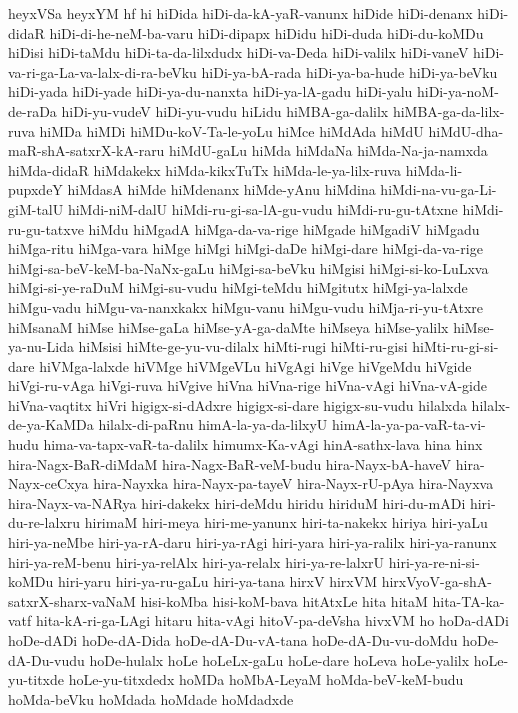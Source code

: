{heyxVSa
heyxYM
hf
hi
hiDida
hiDi-da-kA-yaR-vanunx
hiDide
hiDi-denanx
hiDi-didaR
hiDi-di-he-neM-ba-varu
hiDi-dipapx
hiDidu
hiDi-duda
hiDi-du-koMDu
hiDisi
hiDi-taMdu
hiDi-ta-da-lilxdudx
hiDi-va-Deda
hiDi-valilx
hiDi-vaneV
hiDi-va-ri-ga-La-va-lalx-di-ra-beVku
hiDi-ya-bA-rada
hiDi-ya-ba-hude
hiDi-ya-beVku
hiDi-yada
hiDi-yade
hiDi-ya-du-nanxta
hiDi-ya-lA-gadu
hiDi-yalu
hiDi-ya-noM-de-raDa
hiDi-yu-vudeV
hiDi-yu-vudu
hiLidu
hiMBA-ga-dalilx
hiMBA-ga-da-lilx-ruva
hiMDa
hiMDi
hiMDu-koV-Ta-le-yoLu
hiMce
hiMdAda
hiMdU
hiMdU-dha-maR-shA-satxrX-kA-raru
hiMdU-gaLu
hiMda
hiMdaNa
hiMda-Na-ja-namxda
hiMda-didaR
hiMdakekx
hiMda-kikxTuTx
hiMda-le-ya-lilx-ruva
hiMda-li-pupxdeY
hiMdasA
hiMde
hiMdenanx
hiMde-yAnu
hiMdina
hiMdi-na-vu-ga-Li-giM-talU
hiMdi-niM-dalU
hiMdi-ru-gi-sa-lA-gu-vudu
hiMdi-ru-gu-tAtxne
hiMdi-ru-gu-tatxve
hiMdu
hiMgadA
hiMga-da-va-rige
hiMgade
hiMgadiV
hiMgadu
hiMga-ritu
hiMga-vara
hiMge
hiMgi
hiMgi-daDe
hiMgi-dare
hiMgi-da-va-rige
hiMgi-sa-beV-keM-ba-NaNx-gaLu
hiMgi-sa-beVku
hiMgisi
hiMgi-si-ko-LuLxva
hiMgi-si-ye-raDuM
hiMgi-su-vudu
hiMgi-teMdu
hiMgitutx
hiMgi-ya-lalxde
hiMgu-vadu
hiMgu-va-nanxkakx
hiMgu-vanu
hiMgu-vudu
hiMja-ri-yu-tAtxre
hiMsanaM
hiMse
hiMse-gaLa
hiMse-yA-ga-daMte
hiMseya
hiMse-yalilx
hiMse-ya-nu-Lida
hiMsisi
hiMte-ge-yu-vu-dilalx
hiMti-rugi
hiMti-ru-gisi
hiMti-ru-gi-si-dare
hiVMga-lalxde
hiVMge
hiVMgeVLu
hiVgAgi
hiVge
hiVgeMdu
hiVgide
hiVgi-ru-vAga
hiVgi-ruva
hiVgive
hiVna
hiVna-rige
hiVna-vAgi
hiVna-vA-gide
hiVna-vaqtitx
hiVri
higigx-si-dAdxre
higigx-si-dare
higigx-su-vudu
hilalxda
hilalx-de-ya-KaMDa
hilalx-di-paRnu
himA-la-ya-da-lilxyU
himA-la-ya-pa-vaR-ta-vi-hudu
hima-va-tapx-vaR-ta-dalilx
himumx-Ka-vAgi
hinA-sathx-lava
hina
hinx
hira-Nagx-BaR-diMdaM
hira-Nagx-BaR-veM-budu
hira-Nayx-bA-haveV
hira-Nayx-ceCxya
hira-Nayxka
hira-Nayx-pa-tayeV
hira-Nayx-rU-pAya
hira-Nayxva
hira-Nayx-va-NARya
hiri-dakekx
hiri-deMdu
hiridu
hiriduM
hiri-du-mADi
hiri-du-re-lalxru
hirimaM
hiri-meya
hiri-me-yanunx
hiri-ta-nakekx
hiriya
hiri-yaLu
hiri-ya-neMbe
hiri-ya-rA-daru
hiri-ya-rAgi
hiri-yara
hiri-ya-ralilx
hiri-ya-ranunx
hiri-ya-reM-benu
hiri-ya-relAlx
hiri-ya-relalx
hiri-ya-re-lalxrU
hiri-ya-re-ni-si-koMDu
hiri-yaru
hiri-ya-ru-gaLu
hiri-ya-tana
hirxV
hirxVM
hirxVyoV-ga-shA-satxrX-sharx-vaNaM
hisi-koMba
hisi-koM-bava
hitAtxLe
hita
hitaM
hita-TA-ka-vatf
hita-kA-ri-ga-LAgi
hitaru
hita-vAgi
hitoV-pa-deVsha
hivxVM
ho
hoDa-dADi
hoDe-dADi
hoDe-dA-Dida
hoDe-dA-Du-vA-tana
hoDe-dA-Du-vu-doMdu
hoDe-dA-Du-vudu
hoDe-hulalx
hoLe
hoLeLx-gaLu
hoLe-dare
hoLeva
hoLe-yalilx
hoLe-yu-titxde
hoLe-yu-titxdedx
hoMDa
hoMbA-LeyaM
hoMda-beV-keM-budu
hoMda-beVku
hoMdada
hoMdade
hoMdadxde
}
